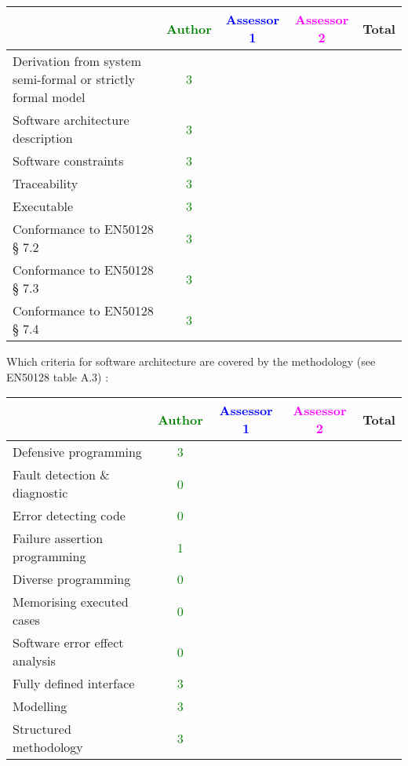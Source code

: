 \begin{tabular}{|l | c | c | c | c|}
\hline
& \textcolor{green}{Author} & \textcolor{blue}{Assessor 1} & \textcolor{magenta}{Assessor 2} & Total \\
\hline
Derivation from system semi-formal or strictly formal model  & \textcolor{green}{3} & & &  \\
\hline 
Software architecture description  & \textcolor{green}{3} & & &  \\
\hline
Software constraints  & \textcolor{green}{3} & & &  \\
\hline
Traceability  & \textcolor{green}{3} & & &  \\
\hline
Executable  & \textcolor{green}{3} & & &  \\
\hline
Conformance to EN50128 § 7.2  & \textcolor{green}{3} & & &  \\
\hline
Conformance to EN50128 § 7.3  & \textcolor{green}{3} & & &  \\
\hline
Conformance to EN50128 § 7.4  & \textcolor{green}{3}& & &  \\
\hline
\end{tabular}

Which criteria for software architecture are covered by the methodology
(see EN50128 table A.3) :

\begin{tabular}{|l | c | c | c | c|}
\hline
& \textcolor{green}{Author} & \textcolor{blue}{Assessor 1} & \textcolor{magenta}{Assessor 2} & Total \\
\hline
Defensive programming  & \textcolor{green}{3} & & &  \\
\hline 
Fault detection \& diagnostic  & \textcolor{green}{0} & & &  \\
\hline
Error detecting code  & \textcolor{green}{0} & & &  \\
\hline
Failure assertion programming & \textcolor{green}{1} & & &  \\
\hline
Diverse programming & \textcolor{green}{0} & & &  \\
\hline
Memorising executed cases & \textcolor{green}{0} & & &  \\
\hline
Software error effect analysis & \textcolor{green}{0} & & &  \\
\hline
Fully defined interface & \textcolor{green}{3} & & &  \\
\hline
Modelling  & \textcolor{green}{3} & & &  \\
\hline
Structured methodology & \textcolor{green}{3} & & &  \\
\hline
\end{tabular}

